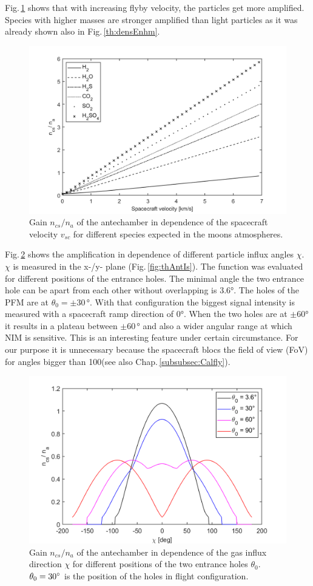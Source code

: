 		Fig.\,\ref{th:densEnhvelo} shows that with increasing flyby velocity, the particles get more amplified. Species with higher masses are stronger amplified than light particles as it was already shown also in Fig.\,\ref{th:densEnhm}.\\
		\begin{figure}[h!] %
			\centering
			\includegraphics[width= .7\textwidth]{Bilder/velocity.png}
			\caption{Gain $n_{cs}/n_a$ of the antechamber in dependence of the spacecraft velocity $v_{sc}$ for different species expected in the moons atmospheres.}
			\label{th:densEnhvelo}
		\end{figure}
		Fig.\,\ref{th:densEnhChiTheta} shows the amplification in dependence of different particle influx angles $\chi$. $\chi$ is measured in the x-/y- plane (Fig.\,\ref{fig:thAntIs}). The function was evaluated for different positions of the entrance holes. The minimal angle the two entrance hole can be apart from each other without overlapping is 3.6\si{\degree}. The holes of the PFM are at $\theta_0 = \pm30\,\si{\degree}$. With that configuration the biggest signal intensity is measured with a spacecraft ramp direction of 0\si{\degree}. When the two holes are at $\pm$60\si{\degree} it results in a plateau between $\pm$60\,\si{\degree} and also a wider angular range at which NIM is sensitive. This is an interesting feature under certain circumstance. For our purpose it is unnecessary because the spacecraft blocs the field of view (FoV) for angles bigger than 100\degree (see also Chap.\,\ref{subsubsec:Calfly}).
		\begin{figure}[h!] %
			\centering
			\includegraphics[width= .8\textwidth]{Bilder/Chi_theta0.png}
			\caption{Gain $n_{cs}/n_a$ of the antechamber in dependence of the gas influx direction $\chi$ for different positions of the two entrance holes $\theta_0$. $\theta_0=30^\circ$ is the position of the holes in flight configuration.}
			\label{th:densEnhChiTheta}
		\end{figure}
		
